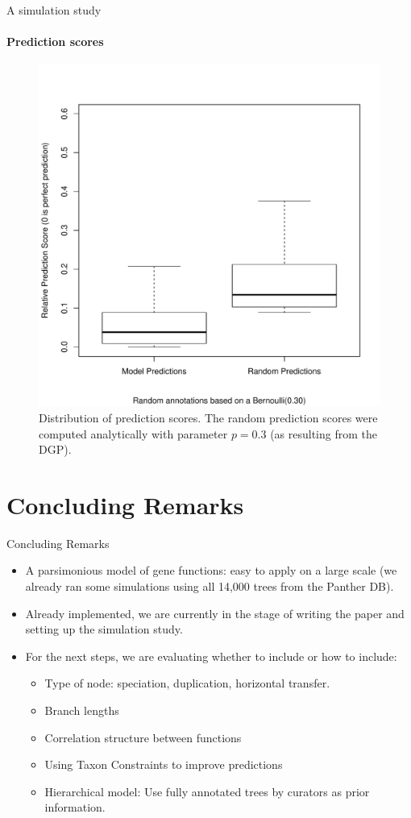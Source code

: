 \documentclass[9pt,handout,ignorenonframetext,]{beamer}
\begin{document}
\begin{frame}[t]{A simulation study}

\framesubtitle{Prediction scores}

\begin{figure}
\centering
\includegraphics[width=.6\linewidth, trim = {0 1cm 0 2cm}, clip]{mcmc_right_prior_prediction.pdf}
\caption{Distribution of prediction scores. The random prediction scores were computed analytically with parameter $p=0.3$ (as resulting from the DGP).}
\end{figure}

\end{frame}

\section{Concluding Remarks}\label{concluding-remarks}

\begin{frame}{Concluding Remarks}

\begin{itemize}
\item
  A parsimonious model of gene functions: easy to apply on a large scale
  (we already ran some simulations using all 14,000 trees from the
  Panther DB).\pause
\item
  Already implemented, we are currently in the stage of writing the
  paper and setting up the simulation study.\pause
\item
  For the next steps, we are evaluating whether to include or how to
  include:\pause

  \begin{itemize}
  \item
    Type of node: speciation, duplication, horizontal transfer.
  \item
    Branch lengths
  \item
    Correlation structure between functions
  \item
    Using Taxon Constraints to improve predictions
  \item
    Hierarchical model: Use fully annotated trees by curators as prior
    information.
  \end{itemize}
\end{itemize}

\end{frame}
\end{document}
